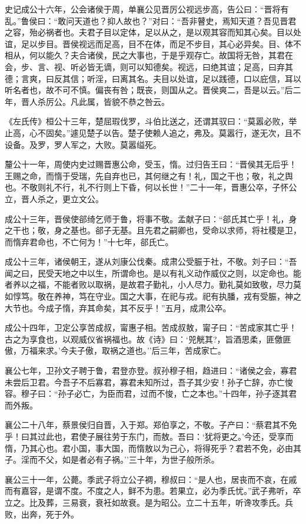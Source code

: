 \documentclass[]{article}
\begin{document}
史记成公十六年，公会诸侯于周，单襄公见晋厉公视远步高，告公曰：``晋将有乱。''鲁侯曰：``敢问天道也？抑人故也？''对曰：``吾非瞽史，焉知天道？吾见晋君之容，殆必祸者也。夫君子目以定体，足以从之，是以观其容而知其心矣。目以处谊，足以步目。晋侯视远而足高，目不在体，而足不步目，其心必异矣。目、体不相从，何以能久？夫合诸侯，民之大事也，于是乎观存亡。故国将无咎，其君在会，步、言、视、听必皆无谪，则可以知德矣。视远，曰绝其谊；足高，曰弃其德；言爽，曰反其信；听淫，曰离其名。夫目以处谊，足以践德，口以庇信，耳以听名者也，故不可不慎。偏丧有咎；既丧，则国从之。晋侯爽二，吾是以云。''后二年，晋人杀厉公。凡此属，皆貌不恭之咎云。

《左氏传》桓公十三年，楚屈瑕伐罗，斗伯比送之，还谓其驭曰：``莫嚣必败，举止高，心不固矣。''遽见楚子以告。楚子使赖人追之，弗及。莫嚣行，遂无次，且不设备。及罗，罗人军之，大败。莫嚣缢死。

釐公十一年，周使内史过赐晋惠公命，受玉，惰。过归告王曰：``晋侯其无后乎！王赐之命，而惰于受瑞，先自弃也已，其何继之有！礼，国之干也；敬，礼之舆也。不敬则礼不行，礼不行则上下昏，何以长世！''二十一年，晋惠公卒，子怀公立，晋人杀之，更立文公。

成公十三年，晋侯使郤绮乞师于鲁，将事不敬。孟献子曰：``郤氏其亡乎！礼，身之干也；敬，身之基也。郤子无基。且先君之嗣卿也，受命以求师，将社稷是卫，而惰弃君命也，不亡何为！''十七年，郤氏亡。

成公十三年，诸侯朝王，遂从刘康公伐秦。成肃公受脤于社，不敬。刘子曰：``吾闻之曰，民受天地之中以生，所谓命也。是以有礼义动作威仪之则，以定命也。能者养以之福，不能者败以取祸，是故君子勤礼，小人尽力。勤礼莫如致敬，尽力莫如惇笃。敬在养神，笃在守业。国之大事，在祀与戎。祀有执膰，戎有受脤，神之大节也。今成子惰，弃其命矣，其不反乎！''五月，成肃公卒。

成公十四年，卫定公享苦成叔，甯惠子相。苦成叔敖，甯子曰：``苦成家其亡乎！古之为享食也，以观威仪省祸福也。故《诗》曰：`兕觥其?，旨酒思柔，匪儌匪傲，万福来求。'今夫子傲，取祸之道也。''后三年，苦成家亡。

襄公七年，卫孙文子聘于鲁，君登亦登。叔孙穆子相，趋进曰：``诸侯之会，寡君未尝后卫君。今吾子不后寡君，寡君未知所过，吾子其少安！孙子亡辞，亦亡悛容。穆子曰：``孙子必亡，为臣而君，过而不悛，亡之本也。''十四年，孙子逐其君而外叛。

襄公二十八年，蔡景侯归自晋，入于郑。郑伯享之，不敬。子产曰：``蔡君其不免乎！曰其过此也，君使子展往劳于东门，而敖。吾曰：`犹将更之。'今还，受享而惰，乃其心也。君小国，事大国，而惰敖以为己心，将得死乎？君若不免，必由其子。淫而不父，如是者必有子祸。''三十年，为世子般所杀。

襄公三十一年，公薨。季武子将立公子裯，穆叔曰：``是人也，居丧而不哀，在戚而有嘉容，是谓不度。不度之人，鲜不为患。若果立，必为季氏忧。''武子弗听，卒立之。比及葬，三易衰，衰衽如故衰。是为昭公。立二十五年，听谗攻季氏。兵败，出奔，死于外。
\end{document}
